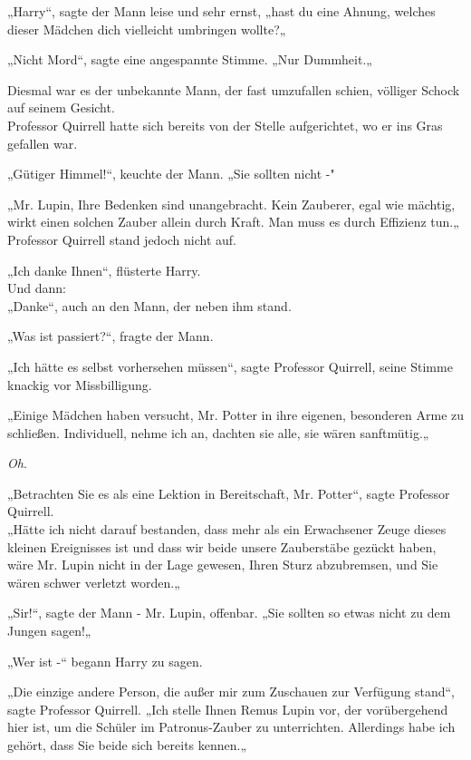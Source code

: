 {„Harry“, sagte der Mann leise und sehr ernst, „hast du eine Ahnung, welches dieser Mädchen dich vielleicht umbringen wollte?„

„Nicht Mord“, sagte eine angespannte Stimme. „Nur Dummheit.„

Diesmal war es der unbekannte Mann, der fast umzufallen schien, völliger Schock auf seinem Gesicht.\\ Professor Quirrell hatte sich bereits von der Stelle aufgerichtet, wo er ins Gras gefallen war.

„Gütiger Himmel!“, keuchte der Mann. „Sie sollten nicht -"

„Mr. Lupin, Ihre Bedenken sind unangebracht. Kein Zauberer, egal wie mächtig, wirkt einen solchen Zauber allein durch Kraft. Man muss es durch Effizienz tun.„\\ Professor Quirrell stand jedoch nicht auf.

„Ich danke Ihnen“, flüsterte Harry.\\ Und dann:\\ „Danke“, auch an den Mann, der neben ihm stand.

„Was ist passiert?“, fragte der Mann.

„Ich hätte es selbst vorhersehen müssen“, sagte Professor Quirrell, seine Stimme knackig vor Missbilligung.

„Einige Mädchen haben versucht, Mr. Potter in ihre eigenen, besonderen Arme zu schließen. Individuell, nehme ich an, dachten sie alle, sie wären sanftmütig.„

\emph{Oh}.

„Betrachten Sie es als eine Lektion in Bereitschaft, Mr. Potter“, sagte Professor Quirrell.\\ „Hätte ich nicht darauf bestanden, dass mehr als ein Erwachsener Zeuge dieses kleinen Ereignisses ist und dass wir beide unsere Zauberstäbe gezückt haben, wäre Mr. Lupin nicht in der Lage gewesen, Ihren Sturz abzubremsen, und Sie wären schwer verletzt worden.„

„Sir!“, sagte der Mann - Mr. Lupin, offenbar. „Sie sollten so etwas nicht zu dem Jungen sagen!„

„Wer ist -“ begann Harry zu sagen.

„Die einzige andere Person, die außer mir zum Zuschauen zur Verfügung stand“, sagte Professor Quirrell. „Ich stelle Ihnen Remus Lupin vor, der vorübergehend hier ist, um die Schüler im Patronus-Zauber zu unterrichten. Allerdings habe ich gehört, dass Sie beide sich bereits kennen.„

}

